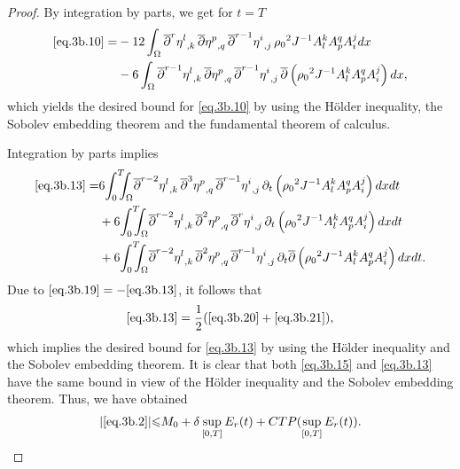 \documentclass[12pt,twoside,reqno]{amsart}
\numberwithin{equation}{section}
\theoremstyle{definition}
\theoremstyle{remark}
\begin{document}
\begin{proof}
By integration by parts, we get for $t=T$
\begin{align*}
  \eqref{eq.3b.10}=&-12\int_\Omega {{{{\overline{\partial}}^r\eta^l}}_{,{k}}\,} {{{{\overline{\partial}}\eta^p}}_{,{q}}\,}{{{{\overline{\partial}}^{r-1} \eta^i}}_{,{j}}\,}{\rho_0}^2 J^{-1}A^k_l A^q_p  A^j_i dx\\
  &-6\int_\Omega {{{{\overline{\partial}}^{r-1}\eta^l}}_{,{k}}\,} {{{{\overline{\partial}}\eta^p}}_{,{q}}\,}{{{{\overline{\partial}}^{r-1} \eta^i}}_{,{j}}\,}{\overline{\partial}}\left({\rho_0}^2 J^{-1}A^k_l A^q_p  A^j_i\right) dx,
\end{align*}
which yields the desired bound for \eqref{eq.3b.10} by using the H\"older inequality, the Sobolev embedding theorem and the fundamental theorem of calculus.

Integration by parts implies
\begin{align}
  \eqref{eq.3b.13}=&6{\int_0^T\!\!\!\!\int_\Omega } {{{{\overline{\partial}}^{r-2}\eta^l}}_{,{k}}\,} {{{{\overline{\partial}}^3\eta^p}}_{,{q}}\,}{{{{\overline{\partial}}^{r-1} \eta^i}}_{,{j}}\,}{\partial}_t\left({\rho_0}^2 J^{-1}A^k_l A^q_p  A^j_i\right) dxdt\label{eq.3b.19}\\
  &  +6{\int_0^T\!\!\!\!\int_\Omega } {{{{\overline{\partial}}^{r-2}\eta^l}}_{,{k}}\,} {{{{\overline{\partial}}^2\eta^p}}_{,{q}}\,}{{{{\overline{\partial}}^r \eta^i}}_{,{j}}\,}{\partial}_t\left({\rho_0}^2 J^{-1}A^k_l A^q_p  A^j_i\right) dxdt\label{eq.3b.20}\\
  & + 6{\int_0^T\!\!\!\!\int_\Omega } {{{{\overline{\partial}}^{r-2}\eta^l}}_{,{k}}\,} {{{{\overline{\partial}}^2\eta^p}}_{,{q}}\,}{{{{\overline{\partial}}^{r-1} \eta^i}}_{,{j}}\,}{\partial}_t{\overline{\partial}}\left({\rho_0}^2 J^{-1}A^k_l A^q_p  A^j_i\right) dxdt.\label{eq.3b.21}
\end{align}
Due to $\eqref{eq.3b.19}=-\eqref{eq.3b.13}$, it follows that
\begin{align*}
  \eqref{eq.3b.13}=\frac{1}{2}(\eqref{eq.3b.20}+\eqref{eq.3b.21}),
\end{align*}
which implies the desired bound for \eqref{eq.3b.13} by using the H\"older inequality and the Sobolev embedding theorem. It is clear that both \eqref{eq.3b.15} and \eqref{eq.3b.13} have the same bound in view of the H\"older inequality and the Sobolev embedding theorem. Thus, we have obtained
\begin{align*}
  {\vert{\eqref{eq.3b.2}}\vert}{\leqslant}  M_0+\delta \sup_{[0,T]}E_r(t)+CTP(\sup_{[0,T]}E_r(t)).
\end{align*}


\end{proof}
\end{document}
